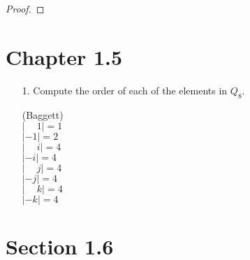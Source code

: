 \documentclass[10pt]{article}
\begin{document}
\begin{itemize}
\begin{itemize}
\begin{proof}
	\end{proof}
	
	\end{itemize}
	
\end{itemize}

\section*{Chapter 1.5}

\begin{itemize}

\item[1.] Compute the order of each of the elements in $Q_8$.

(Baggett) 
\\ $\left|\phantom{-}1\right| = 1$
\\ $\left|-1\right| = 2$
\\ $\left|\phantom{-}i\right| = 4$
\\ $\left|-i\right| = 4$
\\ $\left|\phantom{-}j\right| = 4$
\\ $\left|-j\right| = 4$
\\ $\left|\phantom{-}k\right| = 4$
\\ $\left|-k\right| = 4$

\end{itemize}



\section*{Section 1.6}
\end{document}
